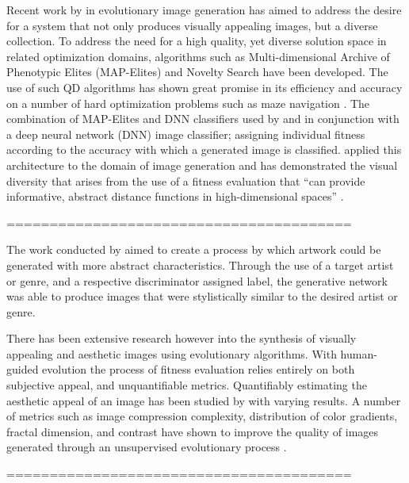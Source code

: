 \documentclass{article}
\begin{document}
	Recent work by \citet{nguyen2015deep, nguyen2015innovation} in evolutionary image generation has aimed to address the desire for a system that not only produces visually appealing images, but a diverse collection.
	To address the need for a high quality, yet diverse solution space in related optimization domains, algorithms such as Multi-dimensional Archive of Phenotypic Elites (MAP-Elites) \citep{mouret2015illuminating} and Novelty Search \citep{lehman2008exploiting, lehman2011abandoning} have been developed.
	The use of such QD algorithms has shown great promise in its efficiency and accuracy on a number of hard optimization problems \citep{pugh2016quality} such as maze navigation \citep{lehman2011abandoning}.
	The combination of MAP-Elites and DNN classifiers used by \citet{nguyen2015deep} and \citet{nguyen2015innovation} in conjunction with a deep neural network (DNN) image classifier; assigning individual fitness according to the accuracy with which a generated image is classified.
	\citet{nguyen2015innovation} applied this architecture to the domain of image generation and has demonstrated the visual diversity that arises from the use of a fitness evaluation that ``can provide informative, abstract distance functions in high-dimensional spaces'' \citep[p.~8]{nguyen2015innovation}.
	
	========================================
	
	The work conducted by \citet{tan2017artgan} aimed to create a process by which artwork could be generated with more abstract characteristics. 
	Through the use of a target artist or genre, and a respective discriminator assigned label, the generative network was able to produce images that were stylistically similar to the desired artist or genre.
	
	There has been extensive research however into the synthesis of visually appealing and aesthetic images using evolutionary algorithms.
	With human-guided evolution \citep{nevar} the process of fitness evaluation relies entirely on both subjective appeal, and unquantifiable metrics.
	Quantifiably estimating the aesthetic appeal of an image has been studied by \citet{den2010comparing, den2010using, den2011evolving} with varying results.
	A number of metrics such as image compression complexity, distribution of color gradients, fractal dimension, and contrast have shown to improve the quality of images generated through an unsupervised evolutionary process \citep{den2014investigating}.
	
	========================================
	
\end{document}

